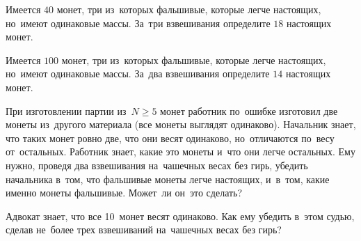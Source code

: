 \begin{problems}
\item
Имеется $40$ монет, три из~которых
фальшивые, которые легче настоящих, но~имеют одинаковые массы.
За~три взвешивания определите $18$ настоящих монет.

\item
Имеется $100$ монет, три из~которых
фальшивые, которые легче настоящих, но~имеют одинаковые массы.
За~два взвешивания определите $14$ настоящих монет.

\item
При изготовлении партии из~$N \geq 5$  монет работник по~ошибке изготовил
две монеты из~другого материала (все монеты выглядят одинаково).
Начальник знает, что таких монет ровно две, что они весят одинаково,
но~отличаются по~весу от~остальных.
Работник знает, какие это монеты и~что они легче остальных.
Ему нужно, проведя два взвешивания на~чашечных весах без гирь, убедить
начальника в~том, что фальшивые монеты легче настоящих, и~в~том, какие именно
монеты фальшивые.
Может~ли он~это сделать?

\item
Адвокат знает, что все 10~монет весят одинаково.
Как ему убедить в~этом судью, сделав не~более трех взвешиваний на~чашечных
весах без гирь?

\end{problems}


